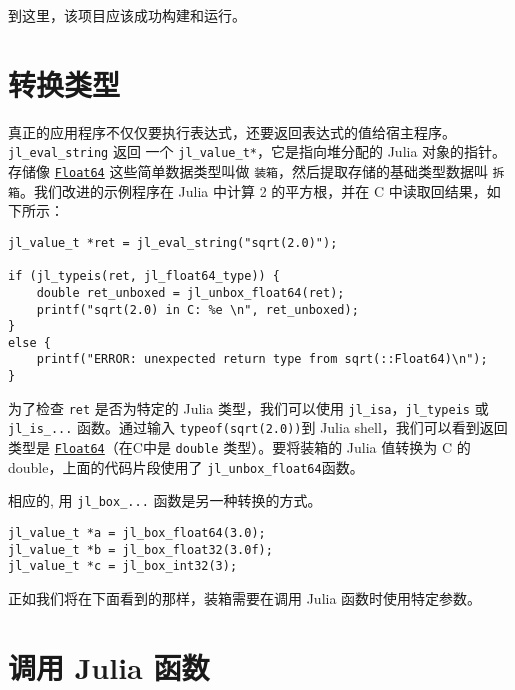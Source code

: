到这里，该项目应该成功构建和运行。



\hypertarget{4573294506139022977}{}


\section{转换类型}



真正的应用程序不仅仅要执行表达式，还要返回表达式的值给宿主程序。\texttt{jl\_eval\_string} 返回 一个 \texttt{jl\_value\_t*}，它是指向堆分配的 Julia 对象的指针。存储像 \hyperlink{5027751419500983000}{\texttt{Float64}} 这些简单数据类型叫做 \texttt{装箱}，然后提取存储的基础类型数据叫 \texttt{拆箱}。我们改进的示例程序在 Julia 中计算 2 的平方根，并在 C 中读取回结果，如下所示：




\begin{lstlisting}
jl_value_t *ret = jl_eval_string("sqrt(2.0)");

if (jl_typeis(ret, jl_float64_type)) {
    double ret_unboxed = jl_unbox_float64(ret);
    printf("sqrt(2.0) in C: %e \n", ret_unboxed);
}
else {
    printf("ERROR: unexpected return type from sqrt(::Float64)\n");
}
\end{lstlisting}



为了检查 \texttt{ret} 是否为特定的 Julia 类型，我们可以使用 \texttt{jl\_isa}，\texttt{jl\_typeis} 或 \texttt{jl\_is\_...} 函数。通过输入 \texttt{typeof(sqrt(2.0))}到 Julia shell，我们可以看到返回类型是 \hyperlink{5027751419500983000}{\texttt{Float64}}（在C中是 \texttt{double} 类型）。要将装箱的 Julia 值转换为 C 的double，上面的代码片段使用了 \texttt{jl\_unbox\_float64}函数。



相应的, 用 \texttt{jl\_box\_...} 函数是另一种转换的方式。




\begin{lstlisting}
jl_value_t *a = jl_box_float64(3.0);
jl_value_t *b = jl_box_float32(3.0f);
jl_value_t *c = jl_box_int32(3);
\end{lstlisting}



正如我们将在下面看到的那样，装箱需要在调用 Julia 函数时使用特定参数。



\hypertarget{15001488547709567560}{}


\section{调用 Julia 函数}



